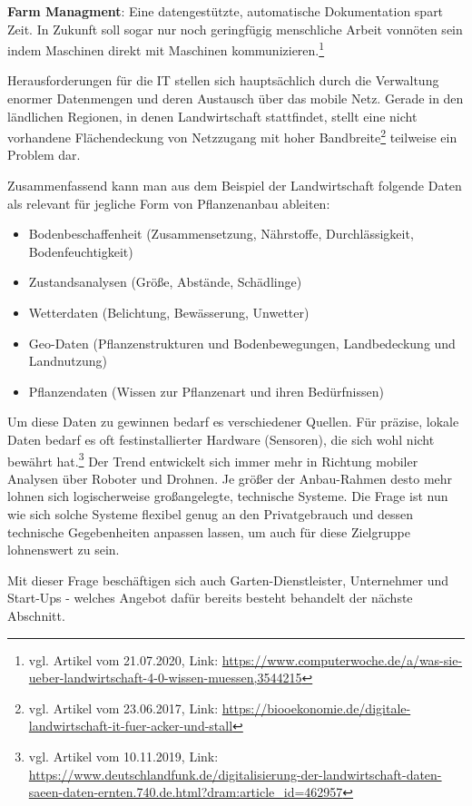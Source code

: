 \textbf{Farm Managment}: Eine datengestützte, automatische Dokumentation
spart Zeit. In Zukunft soll sogar nur noch geringfügig menschliche
Arbeit vonnöten sein indem Maschinen direkt mit Maschinen
kommunizieren.\footnote{vgl. Artikel vom 21.07.2020, Link:
  \url{https://www.computerwoche.de/a/was-sie-ueber-landwirtschaft-4-0-wissen-muessen,3544215}}

Herausforderungen für die IT stellen sich hauptsächlich durch die
Verwaltung enormer Datenmengen und deren Austausch über das mobile Netz.
Gerade in den ländlichen Regionen, in denen Landwirtschaft stattfindet,
stellt eine nicht vorhandene Flächendeckung von Netzzugang mit hoher
Bandbreite\footnote{vgl. Artikel vom 23.06.2017, Link:
  \url{https://biooekonomie.de/digitale-landwirtschaft-it-fuer-acker-und-stall}}
teilweise ein Problem dar.

Zusammenfassend kann man aus dem Beispiel der Landwirtschaft folgende
Daten als relevant für jegliche Form von Pflanzenanbau ableiten:

\begin{itemize}
\tightlist
\item
  Bodenbeschaffenheit (Zusammensetzung, Nährstoffe, Durchlässigkeit,
  Bodenfeuchtigkeit)
\item
  Zustandsanalysen (Größe, Abstände, Schädlinge)
\item
  Wetterdaten (Belichtung, Bewässerung, Unwetter)
\item
  Geo-Daten (Pflanzenstrukturen und Bodenbewegungen, Landbedeckung und
  Landnutzung)
\item
  Pflanzendaten (Wissen zur Pflanzenart und ihren Bedürfnissen)
\end{itemize}

Um diese Daten zu gewinnen bedarf es verschiedener Quellen. Für präzise,
lokale Daten bedarf es oft festinstallierter Hardware (Sensoren), die
sich wohl nicht bewährt hat.\footnote{vgl. Artikel vom 10.11.2019, Link:
  \url{https://www.deutschlandfunk.de/digitalisierung-der-landwirtschaft-daten-saeen-daten-ernten.740.de.html?dram:article_id=462957}}
Der Trend entwickelt sich immer mehr in Richtung mobiler Analysen über
Roboter und Drohnen. Je größer der Anbau-Rahmen desto mehr lohnen sich
logischerweise großangelegte, technische Systeme. Die Frage ist nun wie
sich solche Systeme flexibel genug an den Privatgebrauch und dessen
technische Gegebenheiten anpassen lassen, um auch für diese Zielgruppe
lohnenswert zu sein.

Mit dieser Frage beschäftigen sich auch Garten-Dienstleister,
Unternehmer und Start-Ups - welches Angebot dafür bereits besteht
behandelt der nächste Abschnitt.

